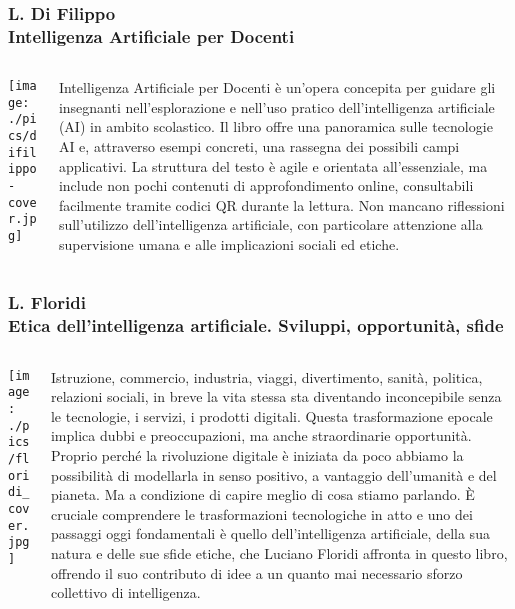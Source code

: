 \documentclass[aspectratio=169]{beamer}
\begin{document}
\begin{frame}
\frametitle{\small L. Di Filippo  \\ \normalsize \textbf{Intelligenza Artificiale per Docenti}}
\begin{columns}[c]
\begin{column}{0.35\textwidth}
    \centering
    \texttt{[image: ./pics/difilippo-cover.jpg]}
\end{column}
\begin{column}{0.6\textwidth}
    {\small
Intelligenza Artificiale per Docenti è un'opera concepita per guidare gli insegnanti nell’esplorazione e nell’uso pratico dell’intelligenza artificiale (AI) in ambito scolastico.
Il libro offre una panoramica sulle tecnologie AI e, attraverso esempi concreti, una rassegna dei possibili campi applicativi. La struttura del testo è agile e orientata all’essenziale, ma include non pochi contenuti di approfondimento online, consultabili facilmente tramite codici QR durante la lettura. Non mancano riflessioni sull’utilizzo dell’intelligenza artificiale, con particolare attenzione alla supervisione umana e alle implicazioni sociali ed etiche.}
\end{column}
\end{columns}
\end{frame}
%
%
\begin{frame}
\frametitle{\small L. Floridi \\ \normalsize \textbf{Etica dell'intelligenza artificiale. Sviluppi, opportunità, sfide}}
\begin{columns}[c]
\begin{column}{0.35\textwidth}
    \centering
    \texttt{[image: ./pics/floridi\_cover.jpg]}
\end{column}
\begin{column}{0.6\textwidth}
    {\small
    Istruzione, commercio, industria, viaggi, divertimento, sanità, politica, relazioni sociali, in breve la vita stessa sta diventando inconcepibile senza le tecnologie, i servizi, i prodotti digitali. Questa trasformazione epocale implica dubbi e preoccupazioni, ma anche straordinarie opportunità. Proprio perché la rivoluzione digitale è iniziata da poco abbiamo la possibilità di modellarla in senso positivo, a vantaggio dell’umanità e del pianeta. Ma a condizione di capire meglio di cosa stiamo parlando. È cruciale comprendere le trasformazioni tecnologiche in atto e uno dei passaggi oggi fondamentali è quello dell’intelligenza artificiale, della sua natura e delle sue sfide etiche, che Luciano Floridi affronta in questo libro, offrendo il suo contributo di idee a un quanto mai necessario sforzo collettivo di intelligenza.}
\end{column}
\end{columns}
\end{frame}
\end{document}
